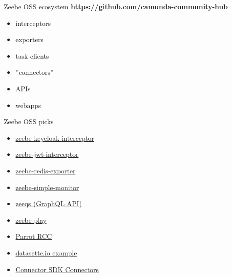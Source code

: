 \documentclass[12pt,aspectratio=169]{beamer}
\begin{document}
\begin{frame}{Zeebe OSS ecosystem}
\textbf{\href{https://github.com/camunda-community-hub/awesome-camunda-platform-8}{https://github.com/camunda-community-hub}}
\begin{itemize}
    \item interceptors
    \item exporters
    \item task clients
    \item ''connectors''
    \item APIs
    \item webapps
\end{itemize}
\end{frame}

\begin{frame}{Zeebe OSS picks}
\par
\vspace{0.5cm}
\par
\begin{minipage}{0.5\textwidth}
\begin{itemize}
    \item \href{https://github.com/camunda-community-hub/zeebe-keycloak-interceptor}{zeebe-keycloak-interceptor}
    \item \href{https://gitlab.com/vasara-bpm/zeebe-jwt-interceptor}{zeebe-jwt-interceptor}
    \item \href{https://github.com/camunda-community-hub/zeebe-redis-exporter}{zeebe-redis-exporter}
    \item \href{https://github.com/camunda-community-hub/zeebe-simple-monitor}{zeebe-simple-monitor}
    \item \href{https://github.com/camunda-community-hub/zeeqs}{zeeqs (GraphQL API)}
    \item \href{https://github.com/camunda-community-hub/zeebe-play}{zeebe-play}
    \item \href{https://github.com/datakurre/parrot-rcc}{Parrot RCC}
    \item \href{https://datakurre.pandala.org/2023/04/diy-zeebe-dashboards/}{datasette.io example}
    \item \href{https://github.com/camunda-community-hub/camunda-8-connectors}{Connector SDK Connectors}
\end{itemize}
\end{minipage}
\begin{minipage}{0.45\textwidth}
\end{minipage}
\end{frame}
\end{document}

